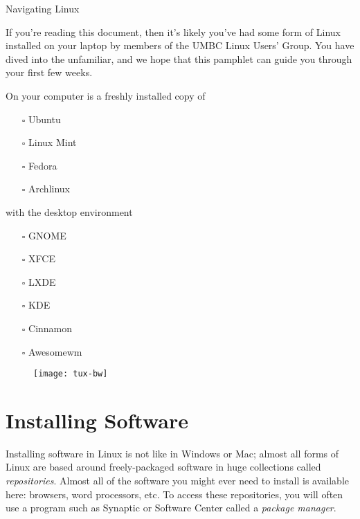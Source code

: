 \documentclass[11pt,notumble]{leaflet}
\begin{document}
\begin{center} \LARGE
    Navigating Linux
\end{center}

If you're reading this document, then it's likely you've had some form of Linux
installed on your laptop by members of the UMBC Linux Users' Group. You have
dived into the unfamiliar, and we hope that this pamphlet can guide you through
your first few weeks.

On your computer is a freshly installed copy of
\begin{multicols}{2}
\begin{itemize}
    \item[$\square$] Ubuntu
    \item[$\square$] Linux Mint
    \item[$\square$] Fedora
    \item[$\square$] Archlinux
\end{itemize}
\end{multicols}
with the desktop environment
\begin{multicols}{2}
\begin{itemize}
    \item[$\square$] GNOME
    \item[$\square$] XFCE
    \item[$\square$] LXDE
    \item[$\square$] KDE
    \item[$\square$] Cinnamon
    \item[$\square$] Awesomewm
\end{itemize}
\end{multicols}

\vfill

\begin{figure}[hb]
    \centering
    \texttt{[image: tux-bw]}
\end{figure}

\pagebreak

\section{Installing Software}
\label{section:installing-software}

Installing software in Linux is not like in Windows or Mac; almost all forms of
Linux are based around freely-packaged software in huge collections called
\emph{repositories}. Almost all of the software you might ever need to install
is available here: browsers, word processors, etc. To access these repositories,
you will often use a program such as Synaptic or Software Center called a
\emph{package manager}.
\end{document}
